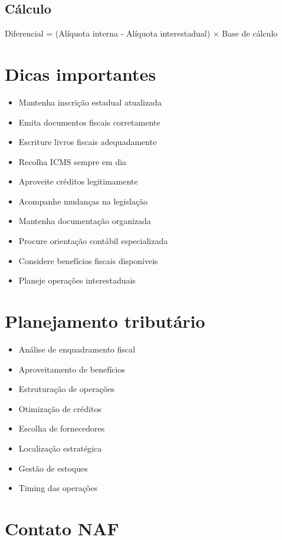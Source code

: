 \documentclass[12pt,a4paper]{article}
\begin{document}
\subsection{Cálculo}
Diferencial = (Alíquota interna - Alíquota interestadual) × Base de cálculo

\section{Dicas importantes}

\begin{itemize}
    \item Mantenha inscrição estadual atualizada
    \item Emita documentos fiscais corretamente
    \item Escriture livros fiscais adequadamente
    \item Recolha ICMS sempre em dia
    \item Aproveite créditos legitimamente
    \item Acompanhe mudanças na legislação
    \item Mantenha documentação organizada
    \item Procure orientação contábil especializada
    \item Considere benefícios fiscais disponíveis
    \item Planeje operações interestaduais
\end{itemize}

\section{Planejamento tributário}

\begin{itemize}
    \item Análise de enquadramento fiscal
    \item Aproveitamento de benefícios
    \item Estruturação de operações
    \item Otimização de créditos
    \item Escolha de fornecedores
    \item Localização estratégica
    \item Gestão de estoques
    \item Timing das operações
\end{itemize}

\section{Contato NAF}
\end{document}
